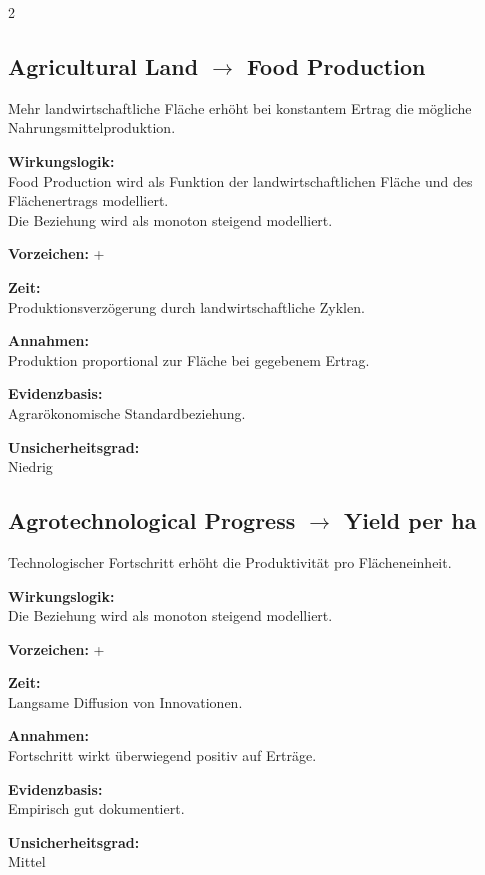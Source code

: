 \documentclass[10pt, a4paper]{article}
\begin{document}
\begin{multicols}{2}

\subsection*{Agricultural Land $\rightarrow$ Food Production}
Mehr landwirtschaftliche Fläche erhöht bei konstantem Ertrag die mögliche Nahrungsmittelproduktion.

\textbf{Wirkungslogik:}\\
Food Production wird als Funktion der landwirtschaftlichen Fläche und des Flächenertrags modelliert. \\
Die Beziehung wird als monoton steigend modelliert.

\textbf{Vorzeichen:} +

\textbf{Zeit:}\\
Produktionsverzögerung durch landwirtschaftliche Zyklen.

\textbf{Annahmen:}\\
Produktion proportional zur Fläche bei gegebenem Ertrag.

\textbf{Evidenzbasis:}\\
Agrarökonomische Standardbeziehung.

\textbf{Unsicherheitsgrad:}\\
Niedrig

\vspace{0.5cm}

\subsection*{Agrotechnological Progress $\rightarrow$ Yield per ha}
Technologischer Fortschritt erhöht die Produktivität pro Flächeneinheit.

\textbf{Wirkungslogik:}\\
Die Beziehung wird als monoton steigend modelliert.

\textbf{Vorzeichen:} +

\textbf{Zeit:}\\
Langsame Diffusion von Innovationen.

\textbf{Annahmen:}\\
Fortschritt wirkt überwiegend positiv auf Erträge.

\textbf{Evidenzbasis:}\\
Empirisch gut dokumentiert.

\textbf{Unsicherheitsgrad:}\\
Mittel


\end{multicols}
\end{document}
